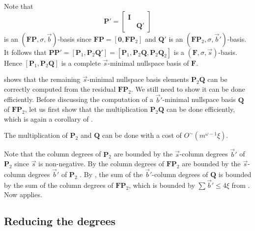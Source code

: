 \begin{pf}
Note that 
\[
\mathbf{P}'=\begin{bmatrix}\mathbf{I}\\
 & \mathbf{Q}'
\end{bmatrix}
\]
 is an $\left(\mathbf{F}\mathbf{P},\sigma,\vec{b}\right)$-basis since
$\mathbf{F}\mathbf{P}=\left[\mathbf{0},\mathbf{F}\mathbf{P}_{2}\right]$
and $\mathbf{Q}'$ is an $\left(\mathbf{F}\mathbf{P}_{2},\sigma,\vec{b}'\right)$-basis.
It follows that $\mathbf{P}\mathbf{P}'=\left[\mathbf{P}_{1},\mathbf{P}_{2}\mathbf{Q}'\right]=\left[\mathbf{P}_{1},\mathbf{P}_{2}\mathbf{Q},\mathbf{P}_{2}\mathbf{Q}_{2}\right]$
is a $\left(\mathbf{F},\sigma,\vec{s}\right)$-basis. Hence $\left[\mathbf{P}_{1},\mathbf{P}_{2}\mathbf{Q}\right]$
is a complete $\vec{s}$-minimal nullspace basis of $\mathbf{F}$.
\end{pf}
 shows that
the remaining $\vec{s}$-minimal nullspace basis elements $\mathbf{P}_{2}\mathbf{Q}$
can be correctly computed from the residual $\mathbf{F}\mathbf{P}_{2}$.
We still need to show it can be done efficiently. Before discussing
the computation of a $\vec{b}'$-minimal nullspace basis $\mathbf{Q}$
of $\mathbf{F}\mathbf{P}_{2}$, let us first show that the multiplication
$\mathbf{P}_{2}\mathbf{Q}$ can be done efficiently, which is again
a corollary of .
\begin{cor}
\label{cor:multiplyingP2Q}The multiplication of $\mathbf{P}_{2}$
and $\mathbf{Q}$ can be done with a cost of $O^{\sim}(m^{\omega-1}\xi)$.\end{cor}
\begin{pf}
Note that the column degrees of $\mathbf{P}_{2}$ are bounded by the
$\vec{s}$-column degrees $\vec{b}'$ of $\mathbf{P}_{2}$ since $\vec{s}$
is non-negative. By  the column
degrees of $\mathbf{F}\mathbf{P}_{2}$ are bounded by the $\vec{s}$-column
degrees $\vec{b}'$ of $\mathbf{P}_{2}$ . By ,
the sum of the $\vec{b}'$-column degrees of $\mathbf{Q}$ is bounded
by the sum of the column degrees of $\mathbf{F}\mathbf{P}_{2}$, which
is bounded by $\sum\vec{b}'\le4\xi$ from .
Now  applies.
\end{pf}

\subsection{Reducing the degrees}

